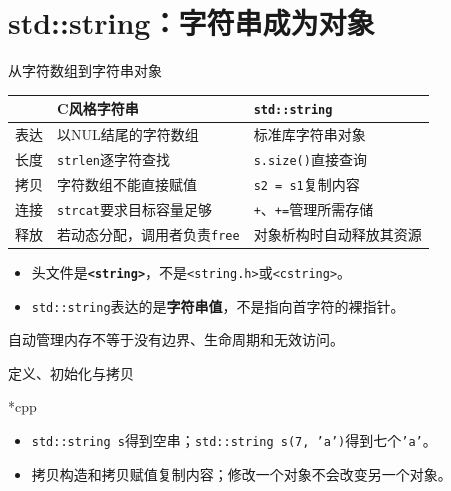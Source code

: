 \section{std::string：字符串成为对象}

\begin{frame}{从字符数组到字符串对象}
\small
\setlength{\tabcolsep}{5pt}
\renewcommand{\arraystretch}{1.3}
\begin{tabular}{p{}p{}p{}}
 & \textbf{C风格字符串} & \textbf{\texttt{std::string}}\\
\hline
表达 & 以NUL结尾的字符数组 & 标准库字符串对象\\
长度 & \texttt{strlen}逐字符查找 & \texttt{s.size()}直接查询\\
拷贝 & 字符数组不能直接赋值 & \texttt{s2 = s1}复制内容\\
连接 & \texttt{strcat}要求目标容量足够 & \texttt{+}、\texttt{+=}管理所需存储\\
释放 & 若动态分配，调用者负责\texttt{free} & 对象析构时自动释放其资源
\end{tabular}

\medskip\normalsize
\begin{itemize}
\item 头文件是\textbf{\texttt{<string>}}，不是\texttt{<string.h>}或\texttt{<cstring>}。
\item \texttt{std::string}表达的是\textbf{字符串值}，不是指向首字符的裸指针。
\end{itemize}
\alert{自动管理内存不等于没有边界、生命周期和无效访问。}
\end{frame}

\begin{frame}{定义、初始化与拷贝}
\begin{Code}*{cpp}\end{Code}
\begin{itemize}
\item \texttt{std::string s}得到空串；\texttt{std::string s(7, 'a')}得到七个\texttt{'a'}。
\item 拷贝构造和拷贝赋值复制内容；修改一个对象不会改变另一个对象。
\end{itemize}
\end{frame}

